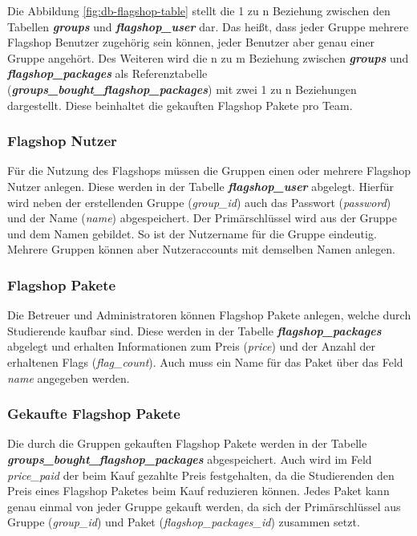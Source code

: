 Die Abbildung \ref{fig:db-flagshop-table} stellt die 1 zu n Beziehung zwischen den Tabellen \textbf{\textit{groups}} und \textbf{\textit{flagshop\_user}} dar. Das heißt, dass jeder Gruppe mehrere Flagshop Benutzer zugehörig sein können, jeder Benutzer aber genau einer Gruppe angehört. Des Weiteren wird die n zu m Beziehung zwischen \textbf{\textit{groups}} und \textbf{\textit{flagshop\_packages}} als Referenztabelle\\ (\textbf{\textit{groups\_bought\_flagshop\_packages}}) mit zwei 1 zu n Beziehungen dargestellt. Diese beinhaltet die gekauften Flagshop Pakete pro Team.

\subsubsection{Flagshop Nutzer}
Für die Nutzung des Flagshops müssen die Gruppen einen oder mehrere Flagshop Nutzer anlegen. Diese werden in der Tabelle \textbf{\textit{flagshop\_user}} abgelegt. Hierfür wird neben der erstellenden Gruppe (\textit{group\_id}) auch das Passwort (\textit{password}) und der Name (\textit{name})  abgespeichert. Der Primärschlüssel wird aus der Gruppe und dem Namen gebildet. So ist der Nutzername für die Gruppe eindeutig. Mehrere Gruppen können aber Nutzeraccounts mit demselben Namen anlegen.

\subsubsection{Flagshop Pakete}
Die Betreuer und Administratoren können Flagshop Pakete anlegen, welche durch Studierende kaufbar sind. Diese werden in der Tabelle \textbf{\textit{flagshop\_packages}} abgelegt und erhalten Informationen zum Preis (\textit{price}) und der Anzahl der erhaltenen Flags (\textit{flag\_count}). Auch muss ein Name für das Paket über das Feld \textit{name} angegeben werden.

\subsubsection{Gekaufte Flagshop Pakete}
Die durch die Gruppen gekauften Flagshop Pakete werden in der Tabelle\\ \textbf{\textit{groups\_bought\_flagshop\_packages}} abgespeichert. Auch wird im Feld \textit{price\_paid} der beim Kauf gezahlte Preis festgehalten, da die Studierenden den Preis eines Flagshop Paketes beim Kauf reduzieren können. Jedes Paket kann genau einmal von jeder Gruppe gekauft werden, da sich der Primärschlüssel aus Gruppe (\textit{group\_id}) und Paket (\textit{flagshop\_packages\_id}) zusammen setzt.

